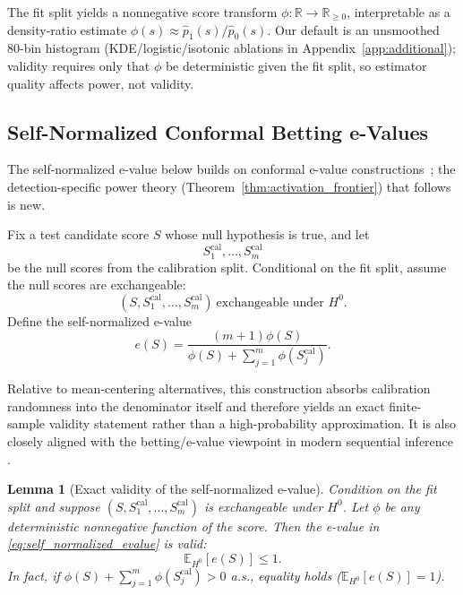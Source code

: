 \documentclass{article}
\newtheorem{lemma}{Lemma}
\theoremstyle{remark}
\newcommand{\E}{\mathbb{E}}
\newcommand{\1}{\mathbf{1}}
\begin{document}
The fit split yields a nonnegative score transform
$\phi : \mathbb{R} \to \mathbb{R}_{\ge 0}$, interpretable as a
density-ratio estimate $\phi(s)\approx\hat{p}_1(s)/\hat{p}_0(s)$.
Our default is an unsmoothed 80-bin histogram
(KDE/logistic/isotonic ablations in
Appendix~\ref{app:additional}); validity requires only that $\phi$
be deterministic given the fit split, so estimator quality affects
power, not validity.

\subsection{Self-Normalized Conformal Betting e-Values}

The self-normalized e-value below builds on conformal e-value
constructions~\cite{vovk2021values,wang2022false}; the
detection-specific power theory
(Theorem~\ref{thm:activation_frontier}) that follows is new.

Fix a test candidate score $S$ whose null hypothesis is true, and let
\begin{equation}
S_1^{\mathrm{cal}}, \dots, S_m^{\mathrm{cal}}
\end{equation}
be the null scores from the calibration split. Conditional on the fit split, assume the null scores are exchangeable:
\begin{equation}
(S, S_1^{\mathrm{cal}}, \dots, S_m^{\mathrm{cal}})
\ \text{exchangeable under } H^0.
\end{equation}
Define the self-normalized e-value
\begin{equation}
e(S)
=
\frac{(m+1)\phi(S)}
{\phi(S) + \sum_{j=1}^m \phi(S_j^{\mathrm{cal}})}.
\label{eq:self_normalized_evalue}
\end{equation}

Relative to mean-centering alternatives, this construction absorbs calibration randomness into the denominator itself and therefore yields an exact finite-sample validity statement rather than a high-probability approximation.
It is also closely aligned with the betting/e-value viewpoint in modern
sequential inference \cite{vovk2021values,10.1093/jrsssb/qkad009}.

\begin{lemma}[Exact validity of the self-normalized e-value]
\label{lem:exact_validity}
Condition on the fit split and suppose $(S, S_1^{\mathrm{cal}}, \dots, S_m^{\mathrm{cal}})$ is exchangeable under $H^0$. Let $\phi$ be any deterministic nonnegative function of the score. Then the e-value in \eqref{eq:self_normalized_evalue} is valid:
\begin{equation}
\E_{H^0}[e(S)] \le 1.
\end{equation}
In fact, if $\phi(S) + \sum_{j=1}^m \phi(S_j^{\mathrm{cal}}) > 0$ a.s., equality holds ($\E_{H^0}[e(S)] = 1$).
\end{lemma}
\end{document}
